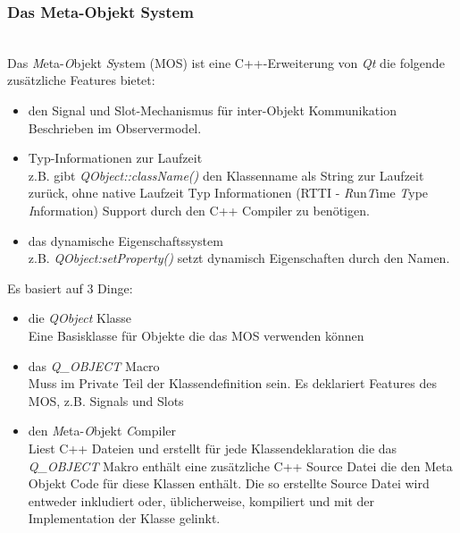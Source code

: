 \subsubsection{Das Meta-Objekt System}\mbox{}\\
Das \textit{M}eta-\textit{O}bjekt \textit{S}ystem (MOS) ist eine C++-Erweiterung von \textit{Qt} die folgende zusätzliche Features bietet:
\begin{itemize}
	\item den Signal und Slot-Mechanismus für inter-Objekt Kommunikation\\[\baselineskip]
Beschrieben im Observermodel.
	\item Typ-Informationen zur Laufzeit\\[\baselineskip]
z.B. gibt \textit{QObject::className()} den Klassenname als String zur Laufzeit zurück, ohne native Laufzeit Typ Informationen (RTTI - \textit{R}un\textit{T}ime \textit{T}ype \textit{I}nformation) Support durch den C++ Compiler zu benötigen.
	\item das dynamische Eigenschaftssystem\\[\baselineskip]
z.B. \textit{QObject:setProperty()} setzt dynamisch Eigenschaften durch den Namen.
\end{itemize}
Es basiert auf 3 Dinge:
\begin{itemize}
	\item die \textit{QObject} Klasse\\[\baselineskip]
Eine Basisklasse für Objekte die das MOS verwenden können
	\item das \textit{Q\_OBJECT} Macro\\[\baselineskip]
Muss im Private Teil der Klassendefinition sein. Es deklariert Features des MOS, z.B. Signals und Slots
	\item den \textit{M}eta-\textit{O}bjekt \textit{C}ompiler\\[\baselineskip]
Liest C++ Dateien und erstellt für jede Klassendeklaration die das \textit{Q\_OBJECT} Makro enthält eine zusätzliche C++ Source Datei die den Meta Objekt Code für diese Klassen enthält. Die so erstellte Source Datei wird entweder inkludiert oder, üblicherweise, kompiliert und mit der Implementation der Klasse gelinkt.
\end{itemize}
\cite{QT_MOC}
\newpage
